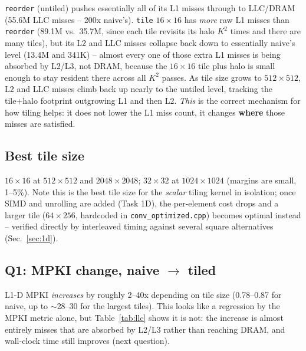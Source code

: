 \documentclass[11pt]{article}
\begin{document}
\texttt{reorder} (untiled) pushes essentially all of its L1 misses through to LLC/DRAM
(55.6M LLC misses -- 200x naive's). \texttt{tile} $16{\times}16$ has \emph{more} raw
L1 misses than \texttt{reorder} (89.1M vs.\ 35.7M, since each tile revisits its halo
$K^2$ times and there are many tiles), but its L2 and LLC misses collapse back down to
essentially naive's level (13.4M and 341K) -- almost every one of those extra L1 misses
is being absorbed by L2/L3, not DRAM, because the $16{\times}16$ tile plus halo is small
enough to stay resident there across all $K^2$ passes. As tile size grows to
$512{\times}512$, L2 and LLC misses climb back up nearly to the untiled level, tracking
the tile+halo footprint outgrowing L1 and then L2. \emph{This} is the correct mechanism
for how tiling helps: it does not lower the L1 miss count, it changes \textbf{where}
those misses are satisfied.

\subsection*{Best tile size}
$16{\times}16$ at $512{\times}512$ and $2048{\times}2048$; $32{\times}32$ at
$1024{\times}1024$ (margins are small, 1--5\%). Note this is the best tile size for the
\emph{scalar} tiling kernel in isolation; once SIMD and unrolling are added (Task 1D),
the per-element cost drops and a larger tile ($64{\times}256$, hardcoded in
\texttt{conv\_optimized.cpp}) becomes optimal instead -- verified directly by
interleaved timing against several square alternatives (Sec.~\ref{sec:1d}).

\subsection*{Q1: MPKI change, naive $\to$ tiled}
L1-D MPKI \emph{increases} by roughly 2--40x depending on tile size (0.78--0.87 for
naive, up to $\sim$28--30 for the largest tiles). This looks like a regression by the
MPKI metric alone, but Table~\ref{tab:llc} shows it is not: the increase is almost
entirely misses that are absorbed by L2/L3 rather than reaching DRAM, and wall-clock
time still improves (next question).
\end{document}
